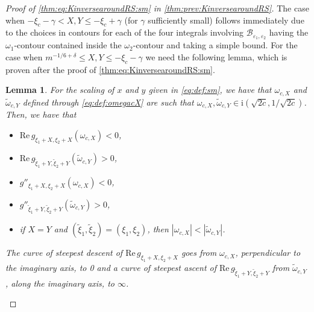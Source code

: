 \documentclass[11pt,twoside]{amsart}
\theoremstyle{plain}
\newtheorem{lem}[thm]{Lemma}
\numberwithin{quest}{section}
\theoremstyle{remark}
\numberwithin{rem}{section}
\theoremstyle{definition}
\newcommand{\eps}{\varepsilon}
\begin{document}
	\begin{proof}[Proof of \eqref{thm:eq:KinversearoundRS:sm} in
		\cref{thm:prev:KinversearoundRS}] 
The case when $-\xi_c - \gamma<X,Y \leq  -\xi_c+\gamma$ (for $\gamma$ sufficiently small) follows immediately due to the choices in contours for each of the four integrals involving $\mathcal{B}_{\eps_1,\eps_2}$ having the $\omega_1$-contour contained inside the $\omega_2$-contour and taking a simple bound.  For the case when $m^{-1/6+\delta}\leq X,Y \leq -\xi_c - \gamma$ we need the following lemma, which is proven after the proof of \eqref{thm:eq:KinversearoundRS:sm}.
		
		
		
		\begin{lem}\label{lem:asym:contourssm}
			For the scaling of $x$ and $y$ given in \eqref{eq:def:sm},  we have that $\omega_{c,X}$ and $\tilde{\omega}_{c,Y}$ defined through \eqref{eq:def:omegacX} are such that 
			$\omega_{c,X}, \tilde{\omega}_{c,Y} \in \mathrm{i}(\sqrt{2c},1/\sqrt{2c})$.  Then, we have that 
			\begin{itemize}
				\item $\mathrm{Re}\, g_{\xi_1+X,\xi_2+X}(\omega_{c,X})<0$,
				\item $\mathrm{Re}\, g_{\tilde{\xi}_1+Y,\tilde{\xi}_2+Y}(\tilde{\omega}_{c,Y})>0$,
				\item $g''_{\xi_1+X,\xi_2+X}(\omega_{c,X})<0$,
				\item $g''_{\tilde{\xi}_1+Y,\tilde{\xi}_2+Y}(\tilde{\omega}_{c,Y})>0$,
				\item if $X=Y$ and $(\tilde{\xi}_1,\tilde{\xi}_2)=(\xi_1,\xi_2)$, then $|\omega_{c,X}| <|\tilde{\omega}_{c,Y}|$.
			\end{itemize}
			The curve of steepest descent of $\mathrm{Re}\,g_{\xi_1+X,\xi_2+X}$ goes from $\omega_{c,X}$, perpendicular to the imaginary axis, to 0 and a curve of steepest ascent of $\mathrm{Re}\,g_{\tilde{\xi}_1+Y,\tilde{\xi}_2+Y}$ from $\tilde{\omega}_{c,Y}$, along the imaginary axis, to $\infty$.  
		\end{lem}


\end{proof}
\end{document}
